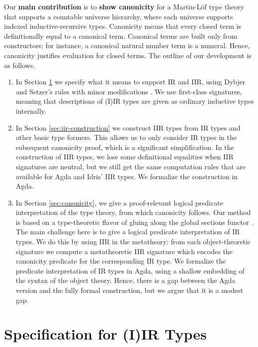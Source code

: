 \documentclass[acmsmall,screen,review,anonymous]{acmart}
\begin{document}
Our \textbf{main contribution} is to \textbf{show canonicity} for a Martin-Löf type theory that
supports a countable universe hierarchy, where each universe supports indexed inductive-recursive
types. Canonicity means that every closed term is definitionally equal to a canonical
term. Canonical terms are built only from constructors; for instance, a canonical natural number
term is a numeral. Hence, canonicity justifies evaluation for closed terms. The outline of our
development is as follows.

\begin{enumerate}
\item In Section \ref{sec:specification} we specify what it means to support IR and IIR, using
  Dybjer and Setzer's rules with minor modifications \cite{DBLP:journals/apal/DybjerS03}. We use
  first-class signatures, meaning that descriptions of (I)IR types are given as ordinary inductive
  types internally.
\item In Section \ref{sec:iir-construction} we construct IIR types from IR types and other basic
  type formers. This allows us to only consider IR types in the subsequent canonicity proof, which
  is a significant simplification. In the construction of IIR types, we lose some definitional
  equalities when IIR signatures are neutral, but we still get the same computation rules that are
  available for Agda and Idris' IIR types. We formalize the construction in Agda.
\item In Section \ref{sec:canonicity}, we give a proof-relevant logical predicate interpretation of
  the type theory, from which canonicity follows. Our method is based on a type-theoretic flavor of
  gluing along the global sections functor \cite{gluing,coquand2018canonicity}. The main challenge
  here is to give a logical predicate interpretation of IR types. We do this by using IIR in the
  metatheory: from each object-theoretic signature we compute a metatheoretic IIR signature which
  encodes the canonicity predicate for the corresponding IR type.  We formalize the predicate
  interpretation of IR types in Agda, using a shallow embedding of the syntax of the object
  theory. Hence, there is a gap between the Agda version and the fully formal construction, but we
  argue that it is a modest gap. 
\end{enumerate}

\section{Specification for (I)IR Types}\label{sec:specification}
\end{document}
